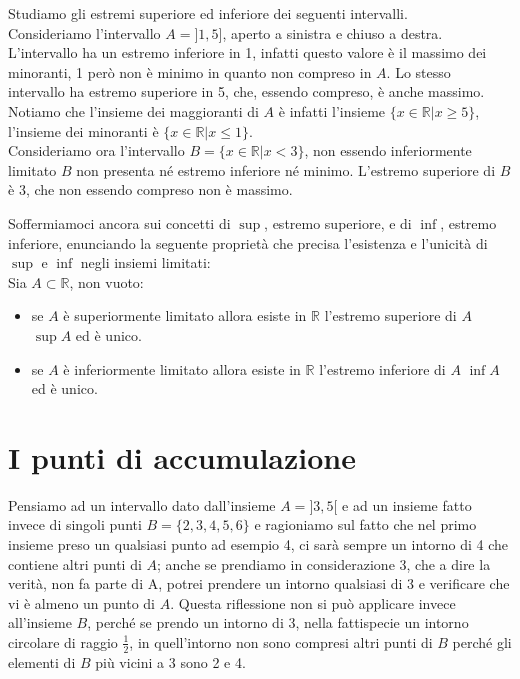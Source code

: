 \begin{esempio}Studiamo gli estremi superiore ed inferiore dei seguenti 
intervalli.\\
Consideriamo l'intervallo $A=]1, 5]$, aperto a sinistra e chiuso a destra. 
L'intervallo ha un estremo inferiore in 1, infatti questo valore è il massimo 
dei minoranti, 1 però non è minimo in quanto non compreso in $A$. Lo stesso 
intervallo ha estremo superiore in 5, che, essendo compreso, è anche massimo. 
Notiamo che l'insieme dei maggioranti di $A$ è infatti l'insieme 
$\{x\in\mathbb{R}\vert x\geq5\}$, l'insieme dei minoranti è 
$\{x\in\mathbb{R}\vert x\leq1\}$.\\
Consideriamo ora l'intervallo $B=\{x\in\mathbb{R}\vert x<3\}$, non essendo 
inferiormente limitato $B$ non presenta né estremo inferiore né minimo. 
L'estremo superiore di $B$ è 3, che non essendo compreso non è massimo.\\
\end{esempio}

Soffermiamoci ancora sui concetti di $\sup$, estremo superiore, e di $\inf$, 
estremo inferiore, enunciando la seguente proprietà che precisa l'esistenza e 
l'unicità di $\sup$ e $\inf$ negli insiemi limitati:\\

Sia $A\subset\mathbb{R}$, non vuoto:
\begin{itemize}
  \item se $A$ è superiormente limitato allora esiste in $\mathbb{R}$ 
l'estremo superiore di $A$ $\sup{A}$ ed è unico.
  \item se $A$ è inferiormente limitato allora esiste in $\mathbb{R}$ 
l'estremo inferiore di $A$ $\inf{A}$ ed è unico.
\end{itemize}

\section{I punti di accumulazione}
Pensiamo ad un intervallo dato dall'insieme $A=]3, 5[$ e ad un insieme fatto 
invece di singoli punti $B=\{2,3,4,5,6\}$ e ragioniamo sul fatto che nel 
primo insieme preso un qualsiasi punto ad esempio 4, ci sarà sempre un 
intorno di 4 che contiene altri punti di $A$; anche se prendiamo in 
considerazione 3, che a dire la verità, non fa parte di A, potrei prendere un 
intorno qualsiasi di 3 e verificare che vi è almeno un punto di $A$. Questa 
riflessione non si può applicare invece all'insieme $B$, perché se prendo un 
intorno di 3, nella fattispecie un intorno circolare di raggio $\frac{1}{2}$, 
in quell'intorno non sono compresi altri punti di $B$ perché gli elementi di 
$B$ più vicini a 3 sono 2 e 4.\\

